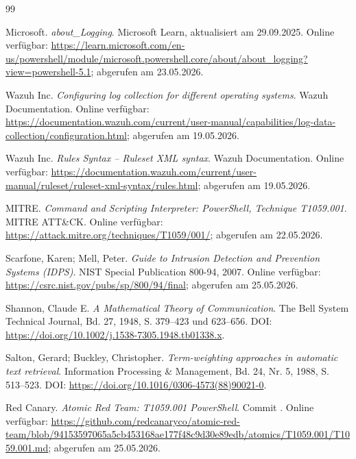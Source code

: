 \documentclass[12pt,a4paper,oneside,parskip=half]{scrreprt}
\begin{document}
\clearpage
{}
{}
\begin{thebibliography}{99}

Microsoft. \emph{about\_Logging}. Microsoft Learn, aktualisiert am 29.09.2025. Online verfügbar: \url{https://learn.microsoft.com/en-us/powershell/module/microsoft.powershell.core/about/about_logging?view=powershell-5.1}; abgerufen am 23.05.2026.

Wazuh Inc. \emph{Configuring log collection for different operating systems}. Wazuh Documentation. Online verfügbar: \url{https://documentation.wazuh.com/current/user-manual/capabilities/log-data-collection/configuration.html}; abgerufen am 19.05.2026.

Wazuh Inc. \emph{Rules Syntax -- Ruleset XML syntax}. Wazuh Documentation. Online verfügbar: \url{https://documentation.wazuh.com/current/user-manual/ruleset/ruleset-xml-syntax/rules.html}; abgerufen am 19.05.2026.

MITRE. \emph{Command and Scripting Interpreter: PowerShell, Technique T1059.001}. MITRE ATT\&CK. Online verfügbar: \url{https://attack.mitre.org/techniques/T1059/001/}; abgerufen am 22.05.2026.

Scarfone, Karen; Mell, Peter. \emph{Guide to Intrusion Detection and Prevention Systems (IDPS)}. NIST Special Publication 800-94, 2007. Online verfügbar: \url{https://csrc.nist.gov/pubs/sp/800/94/final}; abgerufen am 25.05.2026.

Shannon, Claude E. \emph{A Mathematical Theory of Communication}. The Bell System Technical Journal, Bd. 27, 1948, S. 379--423 und 623--656. DOI: \url{https://doi.org/10.1002/j.1538-7305.1948.tb01338.x}.

Salton, Gerard; Buckley, Christopher. \emph{Term-weighting approaches in automatic text retrieval}. Information Processing \& Management, Bd. 24, Nr. 5, 1988, S. 513--523. DOI: \url{https://doi.org/10.1016/0306-4573(88)90021-0}.

Red Canary. \emph{Atomic Red Team: T1059.001 PowerShell}. Commit . Online verfügbar: \url{https://github.com/redcanaryco/atomic-red-team/blob/94153597065a5cb453168ae177f48c9d30e89edb/atomics/T1059.001/T1059.001.md}; abgerufen am 25.05.2026.


\end{thebibliography}
\end{document}

